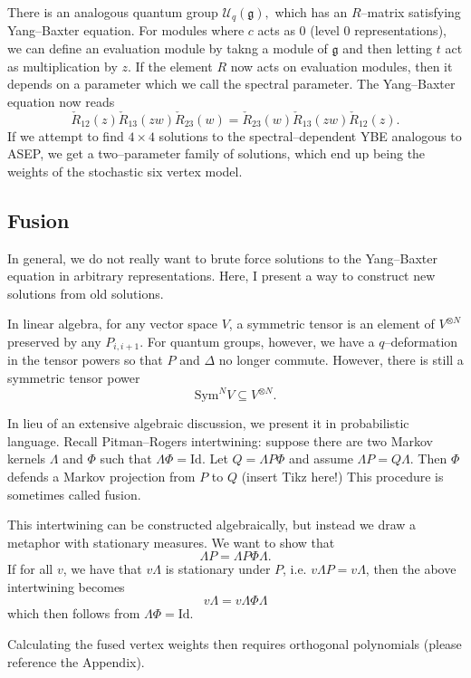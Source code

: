 \documentclass{ximera}
\begin{document}
There is an analogous quantum group $\mathcal{U}_q(\mathfrak{g}),$ which has an $R$--matrix satisfying
Yang--Baxter equation. For modules where $c$ acts as $0$ (level $0$ representations), we can define an
evaluation module by takng a module of $\mathfrak{g}$ and then letting $t$ act as multiplication by $z$. 
If the element $R$ now acts on evaluation modules, then it depends on a parameter which we call the 
spectral parameter. The Yang--Baxter equation now reads
$$
\check{R}_{12}(z) \check{R}_{13}(zw) \check{R}_{23}(w) = \check{R}_{23}(w) \check{R}_{13}(zw) \check{R}_{12}(z).
$$
If we attempt to find $4\times 4$ solutions to the spectral--dependent YBE analogous to ASEP, we get
a two--parameter family of solutions, which end up being the weights of the stochastic six vertex model.

\subsection{Fusion}
In general, we do not really want to brute force solutions to the Yang--Baxter equation in arbitrary
representations. Here, I present a way to construct new solutions from old solutions. 

In linear algebra, for any vector space $V$, a symmetric tensor is an element of $V^{\otimes N}$ 
preserved by any $P_{i,i+1}.$ For quantum groups, however, we have a $q$--deformation in the tensor powers
so that $P$ and $\Delta$ no longer commute. However, there is still a symmetric tensor power
$$
\mathrm{Sym}^N V \subseteq V^{\otimes N}.
$$

In lieu of an extensive algebraic discussion, we present it in probabilistic language. Recall
Pitman--Rogers intertwining: suppose there are 
two Markov kernels $\Lambda$ and $\Phi$ such that $\Lambda\Phi=\mathrm{Id}$. Let $Q=\Lambda P\Phi$ and 
assume $\Lambda P = Q\Lambda.$ Then $\Phi$ defends a Markov projection from $P$ to $Q$ (insert Tikz here!)
This procedure is sometimes called fusion. 

This intertwining can be constructed algebraically, but instead we draw a metaphor with stationary measures.
We want to show that 
$$
\Lambda P = \Lambda P \Phi \Lambda.
$$
If for all $v$, we have that $v\Lambda$ is stationary under $P$, i.e. $v\Lambda P = v\Lambda$, then the
above intertwining becomes 
$$
v\Lambda = v\Lambda \Phi \Lambda
$$
which then follows from $\Lambda\Phi=\mathrm{Id}.$

Calculating the fused vertex weights then requires orthogonal polynomials (please reference the Appendix).
\end{document}
